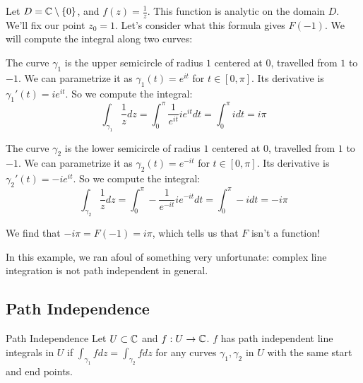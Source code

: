 \begin{ex}{}{} Let $D = \mathbb{C}\setminus\{0\}$, and $f(z) = \frac{1}{z}$. This function is analytic on the domain $D$. We'll fix our point $z_0 =1$. Let's consider what this formula gives $F(-1)$. We will compute the integral along two curves:

\begin{center}
\end{center}

The curve $\gamma_1$ is the upper semicircle of radius $1$ centered at $0$, travelled from $1$ to $-1$. We can parametrize it as $\gamma_1(t) = e^{it}$ for $t\in[0,\pi]$. Its derivative is $\gamma_1'(t) = ie^{it}$. So we compute the integral:
$$\int_{\gamma_1}\frac{1}{z}dz = \int_{0}^\pi \frac{1}{e^{it}}ie^{it}dt = \int_0^\pi idt = i\pi$$


The curve $\gamma_2$ is the lower semicircle of radius $1$ centered at $0$, travelled from $1$ to $-1$. We can parametrize it as $\gamma_2(t) = e^{-it}$ for $t\in[0,\pi]$. Its derivative is $\gamma_2'(t) = -ie^{it}$. So we compute the integral:
$$\int_{\gamma_2}\frac{1}{z}dz = \int_{0}^\pi -\frac{1}{e^{-it}}ie^{-it}dt = \int_0^\pi -idt = -i\pi$$

We find that $-i\pi = F(-1) = i\pi$, which tells us that $F$ isn't a function!
\end{ex}

In this example, we ran afoul of something very unfortunate: complex line integration is not path independent in general.

\subsection{Path Independence}

\begin{defbo}{Path Independence}{}
	Let $U\subset \mathbb{C}$ and $f:U\rightarrow \mathbb{C}$. $f$ has path independent line integrals in $U$ if $\int_{\gamma_1} fdz = \int_{\gamma_2}fdz$ for any curves $\gamma_1,\gamma_2$ in $U$ with the same start and end points.
\end{defbo}


